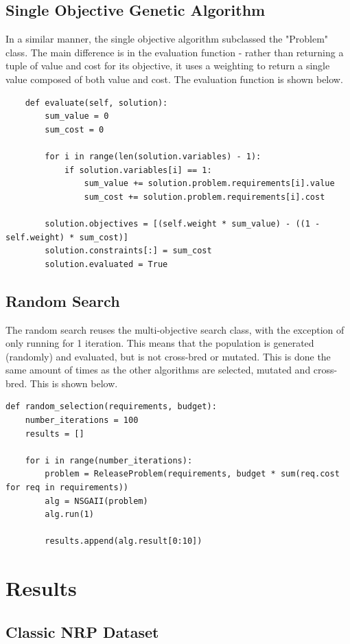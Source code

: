 \documentclass[12pt]{article}
\begin{document}
\subsection{Single Objective Genetic Algorithm}
In a similar manner, the single objective algorithm subclassed the "Problem" class. The main difference is in the evaluation function - rather than returning a tuple of value and cost for its objective, it uses a weighting to return a single value composed of both value and cost. The evaluation function is shown below.

\begin{lstlisting}
    def evaluate(self, solution):
        sum_value = 0
        sum_cost = 0

        for i in range(len(solution.variables) - 1):
            if solution.variables[i] == 1:
                sum_value += solution.problem.requirements[i].value
                sum_cost += solution.problem.requirements[i].cost

        solution.objectives = [(self.weight * sum_value) - ((1 - self.weight) * sum_cost)]
        solution.constraints[:] = sum_cost
        solution.evaluated = True
\end{lstlisting}

\subsection{Random Search}
The random search reuses the multi-objective search class, with the exception of only running for 1 iteration. This means that the population is generated (randomly) and evaluated, but is not cross-bred or mutated. This is done the same amount of times as the other algorithms are selected, mutated and cross-bred. This is shown below.

\begin{lstlisting}
def random_selection(requirements, budget):
    number_iterations = 100
    results = []

    for i in range(number_iterations):
        problem = ReleaseProblem(requirements, budget * sum(req.cost for req in requirements))
        alg = NSGAII(problem)
        alg.run(1)

        results.append(alg.result[0:10])
\end{lstlisting}


\section{Results}
\subsection{Classic NRP Dataset}
\end{document}
